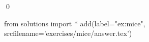 \begin{ex}
  \label{ex:mice}
  
  \qed
\end{ex}
\begin{python0}
from solutions import *
add(label="ex:mice",
    srcfilename='exercises/mice/answer.tex') 
\end{python0}                              
